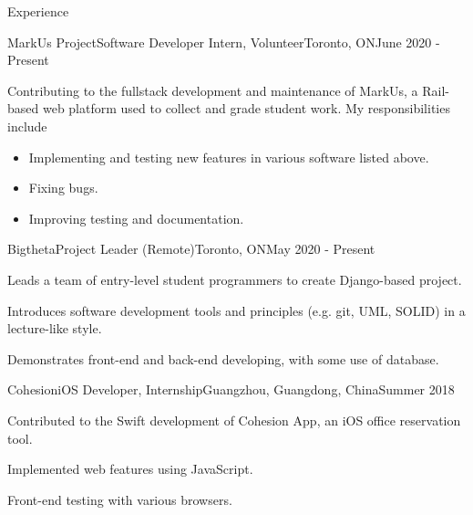 \documentclass{article}
\newlength{\tabin}
\newlength{\secsep}
\newcommand{\lineunder}{\vspace*{-8pt} \\ \hspace*{-6pt} \hrulefill \\ \vspace*{-15pt}}
\newenvironment{tabbedsection}[1]{
  \begin{list}{}{
      \setlength{\itemsep}{0pt}
      \setlength{\labelsep}{0pt}
      \setlength{\labelwidth}{0pt}
      \setlength{\leftmargin}{\tabin}
      \setlength{\rightmargin}{\tabin}
      \setlength{\listparindent}{0pt}
      \setlength{\parsep}{0pt}
      \setlength{\parskip}{0pt}
      \setlength{\partopsep}{0pt}
      \setlength{\topsep}{#1}
    }
  \item[]
}{\end{list}}
\newenvironment{resume_section}[1]{
  \filbreak
  \vspace{2\secsep}
  \textsc{\large#1}
  \lineunder
  \begin{tabbedsection}{\secsep}
}{\end{tabbedsection}}
\newenvironment{subitems}{
  \renewcommand{\labelitemi}{-}
  \begin{itemize}
      \setlength{\labelsep}{1em}
}{\end{itemize}}
\newenvironment{resume_employer}[4]{
  \vspace{\secsep}
  \textbf{#1} \\ 
  \indent {\small #2} \hfill {\footnotesize#3 (#4)}
  \begin{tabbedsection}{0pt}
  \begin{subitems}
}{\end{subitems}\end{tabbedsection}}
\begin{document}
\begin{resume_section}{Experience}
  
 \begin{resume_employer}{MarkUs Project}{Software Developer Intern, Volunteer}{Toronto, ON}{June 2020 - Present}
    \item Contributing to the fullstack development and maintenance of MarkUs, 
     a Rail-based web platform used to collect and grade student work. My responsibilities include
     \begin{itemize}
    \item Implementing and testing new features in various software listed above.
    \item Fixing bugs.
    \item Improving testing and documentation.
     \end{itemize}
  \end{resume_employer}

  \begin{resume_employer}{Bigtheta}{Project Leader (Remote)}{Toronto, ON}{May 2020 - Present}
    \item Leads a team of entry-level student programmers to create Django-based project.
    \item Introduces software development tools and principles (e.g. git, UML, SOLID) in a lecture-like style.  
    \item Demonstrates front-end and back-end developing, with some use of database. 
  \end{resume_employer}
  
  \begin{resume_employer}{Cohesion}{iOS Developer, Internship}{Guangzhou, Guangdong, China}{Summer 2018}
    \item Contributed to the Swift development of Cohesion App, an iOS office reservation tool. 
    \item Implemented web features using JavaScript.
    \item Front-end testing with various browsers.
  \end{resume_employer}
\end{resume_section}
\end{document}
